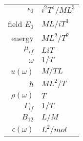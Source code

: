 \begin{tabular}{rl}
   $\epsilon_0$  & $i^2 T^4 / M L^3$ \\
    field $E_0$ & $M L / i T^3$ \\
    energy & $M L^2 / T^2$ \\
    $\mu_{if}$ & $ L i T$ \\
    $\omega$ & $1/T$ \\
    $u(\omega)$ & $M / T L$ \\
    $\hbar$ & $ M L^2 / T$ \\
    $\rho(\omega) $ & $T$ \\
    $\Gamma_{if}$ & $ 1/T$ \\
    $B_{12}$ & $ L / M$ \\
  $\epsilon(\omega)$ & $L^2 / mol$
\end{tabular}

\printbibliography[segment=\therefsegment,heading=subbibliography]
